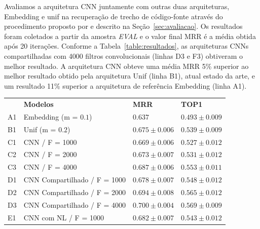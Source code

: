 \documentclass[sigconf]{acmart}
\begin{document}
Avaliamos a arquitetura CNN juntamente com outras duas arquiteturas, Embedding e \Gls{unif} na recuperação de trecho de código-fonte através do procedimento proposto por \cite{iyer-etal-2016-summarizing} e descrito na Seção~\ref{sec:avaliacao}. Os resultados foram coletados a partir da amostra \emph{EVAL} e o valor final MRR é a média obtida após 20 iterações. Conforme a Tabela~\ref{table:resultados}, as arquiteturas CNNs compartilhadas com 4000 filtros convolucionais (linhas D3 e F3) obtiveram o melhor resultado. A arquitetura CNN obteve uma média MRR 5\% superior ao melhor resultado obtido pela arquitetura Unif (linha B1), atual estado da arte, e um resultado 11\% superior a arquitetura de referência Embedding (linha A1). 

\begin{table}[t]
\centering
\begin{tabular}{ p{1cm} p{6cm} >{\raggedleft\arraybackslash}p{4cm} >{\raggedleft\arraybackslash}p{4cm} }
 \hline
    & & \multicolumn{2}{c}{\textbf{Resultados}}\\
 \hline
 & \textbf{Modelos} & \textbf{MRR} & \textbf{TOP1}\\
 \hline
 A1 & Embedding (m = $0.1$) & $0.637$& $0.493 \pm 0.009$\\
 
 \hline
 
 B1 & Unif (m = $0.2$) & $0.675 \pm 0.006$ & $0.539 \pm 0.009$\\
 
 \hline
 
 C1 & CNN / F = 1000 & $0.669 \pm 0.006$ & $0.527 \pm 0.012$\\
 
 C2 & CNN / F = 2000 & $0.673 \pm 0.007$ & $0.531 \pm 0.012$\\
 
 C3 & CNN / F = 4000 & $0.687 \pm 0.006$ & $0.553 \pm 0.011$\\
 
 \hline
 
 D1 & CNN Compartilhado / F = 1000 & $0.678 \pm 0.007$ & $0.548 \pm 0.012$\\
 
 D2 & CNN Compartilhado / F = 2000 & $0.694 \pm 0.008$ & $0.565 \pm 0.012$\\
 
 D3 & CNN Compartilhado / F = 4000 & $0.700 \pm 0.004$ & $0.569 \pm 0.009$\\
 
 \hline
 
 E1 & CNN com NL / F = 1000 & $0.682 \pm 0.007$ & $0.543 \pm 0.012$\\
 

\end{tabular}
\end{table}
\end{document}
